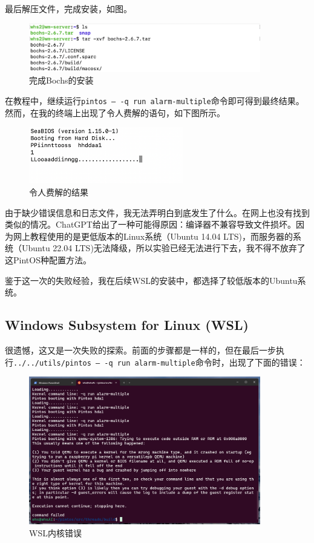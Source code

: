\documentclass{article}
\begin{document}
最后解压文件，完成安装，如图。

\begin{figure}[H]
	\centering
	\includegraphics[width=0.9\textwidth]{img/server_bochs_install.png}
	\caption{完成Bochs的安装}
\end{figure}

在教程中，继续运行\texttt{pintos -- -q run alarm-multiple}命令即可得到最终结果。然而，在我的终端上出现了令人费解的语句，如下图所示。

\begin{figure}[H]
	\centering
	\includegraphics[width=0.6\textwidth]{img/server_error.png}
	\caption{令人费解的结果}
\end{figure}

由于缺少错误信息和日志文件，我无法弄明白到底发生了什么。在网上也没有找到类似的情况。ChatGPT给出了一种可能得原因：编译器不兼容导致文件损坏。因为网上教程使用的是更低版本的Linux系统（Ubuntu 14.04 LTS)，而服务器的系统（Ubuntu 22.04 LTS)无法降级，所以实验已经无法进行下去，我不得不放弃了这PintOS种配置方法。

鉴于这一次的失败经验，我在后续WSL的安装中，都选择了较低版本的Ubuntu系统。

\subsection{Windows Subsystem for Linux (WSL)}

很遗憾，这又是一次失败的探索。前面的步骤都是一样的，但在最后一步执行\texttt{../../utils/pintos -- -q run alarm-multiple}命令时，出现了下面的错误：

\begin{figure}[H]
	\centering
	\includegraphics[width=0.9\textwidth]{img/wsl_fail.png}
	\caption{WSL内核错误}
\end{figure}
\end{document}
